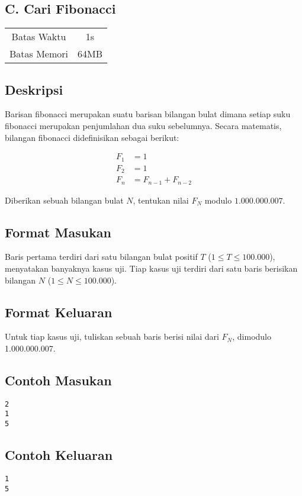\documentclass{article}
\begin{document}
\begin{center}
    \section*{C. Cari Fibonacci} %

    \begin{tabular}{ | c c | }
        \hline
        Batas Waktu  & 1s \\    %
        Batas Memori & 64MB \\  %
        \hline
    \end{tabular}
\end{center}

\subsection*{Deskripsi}

Barisan fibonacci merupakan suatu barisan bilangan bulat dimana setiap suku fibonacci merupakan penjumlahan dua suku sebelumnya. Secara matematis, bilangan fibonacci didefinisikan sebagai berikut:

\begin{align*}
F_1 & = 1 \\
F_2 & = 1 \\
F_n & = F_{n-1} + F_{n-2}
\end{align*}

Diberikan sebuah bilangan bulat $N$, tentukan nilai $F_N$ modulo $1.000.000.007$.

\subsection*{Format Masukan}

Baris pertama terdiri dari satu bilangan bulat positif $T$ ($1 \leq T \leq 100.000$), menyatakan banyaknya kasus uji.
Tiap kasus uji terdiri dari satu baris berisikan bilangan $N$ ($1 \leq N \leq 100.000$).

\subsection*{Format Keluaran}

Untuk tiap kasus uji, tuliskan sebuah baris berisi nilai dari $F_N$, dimodulo 1.000.000.007.
\\

\begin{multicols}{2}
\subsection*{Contoh Masukan}
\begin{lstlisting}
2
1
5
\end{lstlisting}
\columnbreak
\subsection*{Contoh Keluaran}
\begin{lstlisting}
1
5
\end{lstlisting}
\vfill
\null
\end{multicols}


\pagebreak
\end{document}
